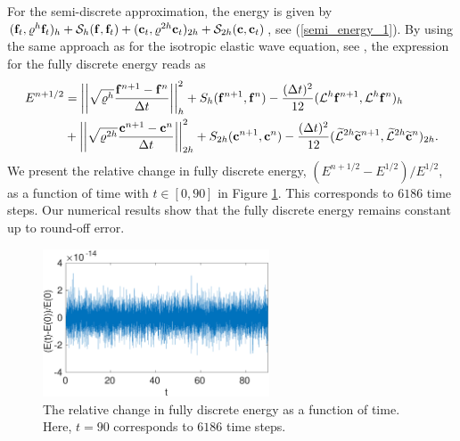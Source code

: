 For the semi-discrete approximation, the energy is given by $({\bf f}_t,\mathcal{\varrho}^h{\bf f}_t)_h + \mathcal{S}_h({\bf f},{\bf f}_t) + ({\bf c}_t,\mathcal{\varrho}^{2h}{\bf c}_t)_{2h} + \mathcal{S}_{2h}({\bf c},{\bf c}_t)$, see (\ref{semi_energy_1}). By using the same approach as for the isotropic elastic wave equation, see \cite{petersson2015wave,sjogreen2012fourth},  the expression for the fully discrete energy reads as
\begin{align*}
E^{n+1/2} &= \left|\left|\sqrt{\mathcal{\varrho}^h}\frac{{\bf f}^{n+1}-{\bf f}^n}{\Delta t}\right|\right|_h^2 + S_h({\bf f}^{n+1},{\bf f}^n) - \frac{(\Delta t)^2}{12}(\mathcal{L}^h{\bf f}^{n+1},\mathcal{L}^h{\bf f}^n)_h\\
&+ \left|\left|\sqrt{\mathcal{\varrho}^{2h}}\frac{{\bf c}^{n+1}-{\bf c}^n}{\Delta t}\right|\right|_{2h}^2 + S_{2h}({\bf c}^{n+1},{\bf c}^n) - \frac{(\Delta t)^2}{12}(\widetilde{\mathcal{L}}^{2h}\widetilde{\bf c}^{n+1},\widetilde{\mathcal{L}}^{2h}\widetilde{\bf c}^n)_{2h}.
\end{align*}
We present the relative change in fully discrete energy, $(E^{n+1/2}-E^{1/2})/E^{1/2}$, as a function of time with $t\in[0,90]$ in Figure \ref{discrete_energy}. This corresponds to $6186$ time steps. Our numerical results show that the fully discrete energy remains constant up to round-off error.
\begin{figure}[htbp]
	\centering
	\includegraphics[width=0.6\textwidth,trim={0cm 0cm 0cm 0cm}, clip]{discrete_energy.eps}
	\caption{The relative change in fully discrete energy as a function of time. Here, $t = 90$ corresponds to $6186$ time steps.}\label{discrete_energy}
\end{figure}


